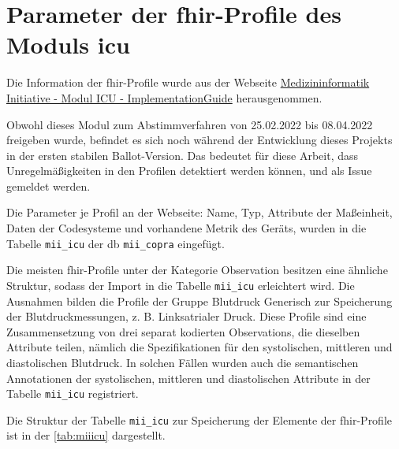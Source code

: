\section{Parameter der \acs{fhir}-Profile des Moduls \glqq\acs{icu}\grqq{}} \label{sec:fhirprofs}

Die Information der \ac{fhir}-Profile wurde aus der Webseite \href{https://www.medizininformatik-initiative.de/Kerndatensatz/Modul_Intensivmedizin/IGMIIKDSModulICU.html}{Medizininformatik Initiative - Modul ICU - ImplementationGuide} herausgenommen. 

Obwohl dieses Modul zum Abstimmverfahren von 25.02.2022 bis 08.04.2022 freigeben wurde, befindet es sich noch während der Entwicklung dieses Projekts in der ersten stabilen Ballot-Version. Das bedeutet für diese Arbeit, dass Unregelmäßigkeiten in den Profilen detektiert werden können, und als Issue gemeldet werden.

Die Parameter je Profil an der Webseite: Name, Typ, Attribute der Maßeinheit, Daten der Codesysteme und vorhandene Metrik des Geräts, wurden in die Tabelle \texttt{mii\_icu} der \ac{db} \texttt{mii\_copra} eingefügt.

Die meisten \ac{fhir}-Profile unter der Kategorie \glqq Observation\grqq{} besitzen eine ähnliche Struktur, sodass der Import in die Tabelle \texttt{mii\_icu} erleichtert wird. Die Ausnahmen bilden die Profile der Gruppe \glqq Blutdruck Generisch\grqq{} zur Speicherung der Blutdruckmessungen, z. B. \glqq Linksatrialer Druck\grqq{}. Diese Profile sind eine Zusammensetzung von drei separat kodierten \glqq Observations\grqq{}, die dieselben Attribute teilen, nämlich die Spezifikationen für den systolischen, mittleren und diastolischen Blutdruck. In solchen Fällen wurden auch die semantischen Annotationen der systolischen, mittleren und diastolischen Attribute in der Tabelle \texttt{mii\_icu} registriert.

\newpage

Die Struktur der Tabelle \texttt{mii\_icu} zur Speicherung der Elemente der \ac{fhir}-Profile ist in der \ref{tab:miiicu} dargestellt.

